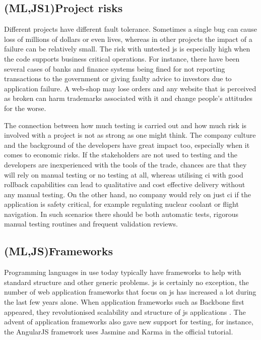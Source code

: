 \documentclass[11pt]{article}
\begin{document}
\subsection{(ML,JS1)Project risks}
\label{subsec:projectrisks}

Different projects have different fault tolerance. Sometimes a single bug can cause loss of millions of dollars or even lives, whereas in other projects the impact of a failure can be relatively small. The risk with untested \gls{js} is especially high when the code supports business critical operations. For instance, there have been several cases of banks and finance systems being fined for not reporting transactions to the government \cite{Bug1} or giving faulty advice to investors \cite{Bug2} due to application failure. A web-shop may lose orders and any website that is perceived as broken can harm trademarks associated with it and change people's attitudes for the worse.

The connection between how much testing is carried out and how much risk is involved with a project is not as strong as one might think. The company culture and the background of the developers have great impact too, especially when it comes to economic risks. If the stakeholders are not used to testing and the developers are inexperienced with the tools of the trade, chances are that they will rely on manual testing or no testing at all, whereas utilising \gls{ci} with good rollback capabilities can lead to qualitative and cost effective delivery without any manual testing. On the other hand, no company would rely on just \gls{ci} if the application is safety critical, for example regulating nuclear coolant or flight navigation. In such scenarios there should be both automatic tests, rigorous manual testing routines and frequent validation reviews. \cite[questions~14,~38]{Ahnve}

\subsection{(ML,JS)Frameworks}
\label{subsec:frameworks}

Programming languages in use today typically have frameworks to help with standard structure and other generic problems. \gls{js} is certainly no exception, the number of web application frameworks that focus on \gls{js} has increased a lot during the last few years alone. When application frameworks such as Backbone first appeared, they revolutionised scalability and structure of \gls{js} applications \cite[question~23]{Ahnve}\cite[question~11]{Rovegard}. The advent of application frameworks also gave new support for testing, for instance, the AngularJS framework uses Jasmine and Karma in the official tutorial.
\end{document}
